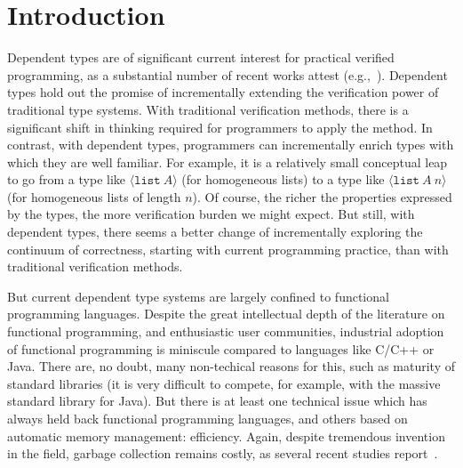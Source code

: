 \documentclass[9pt,natbib]{sigplanconf}
\begin{document}
\section{Introduction}

Dependent types are of significant current interest for practical
verified programming, as a substantial number of recent works attest
(e.g.,~\cite{oury+08,norell07,pasalic+07,sheard06,nanevski+08,licata+05,chenxi05}).
Dependent types hold out the promise of incrementally extending the
verification power of traditional type systems.  With traditional
verification methods, there is a significant shift in thinking
required for programmers to apply the method.
In contrast, with dependent types, programmers can incrementally
enrich types with which they are well familiar.  For example, it is a
relatively small conceptual leap to go from a type like $\langle
\texttt{list}\ A\rangle$ (for homogeneous lists) to a type like
$\langle \texttt{list}\ A\ n\rangle$ (for homogeneous lists of length
$n$).  Of course, the richer the properties expressed by the types,
the more verification burden we might expect.  But still, with
dependent types, there seems a better change of incrementally
exploring the continuum of correctness, starting with current
programming practice, than with traditional verification methods.

But current dependent type systems are largely confined to functional
programming languages.  Despite the great intellectual depth of the
literature on functional programming, and enthusiastic user
communities, industrial adoption of functional programming is
miniscule compared to languages like C/C++ or Java.  There are, no
doubt, many non-techical reasons for this, such as maturity of
standard libraries (it is very difficult to compete, for example, with
the massive standard library for Java).  But there is at least one
technical issue which has always held back functional programming
languages, and others based on automatic memory management:
efficiency.  Again, despite tremendous invention in the field, garbage
collection remains costly, as several recent studies
report~\cite{Xian2008,hertz+05}.
\end{document}
